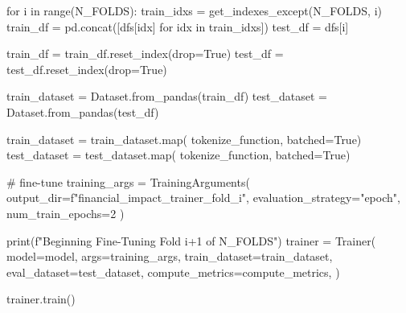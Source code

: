 \begin{python}
for i in range(N_FOLDS):
    train_idxs = get_indexes_except(N_FOLDS, i)
    train_df = pd.concat([dfs[idx] for idx in train_idxs])
    test_df = dfs[i]

    train_df = train_df.reset_index(drop=True)
    test_df = test_df.reset_index(drop=True)

    train_dataset = Dataset.from_pandas(train_df)
    test_dataset = Dataset.from_pandas(test_df)

    train_dataset = train_dataset.map(
        tokenize_function, batched=True)
    test_dataset = test_dataset.map(
        tokenize_function, batched=True)

    # fine-tune
    training_args = TrainingArguments(
        output_dir=f"financial_impact_trainer_fold_{i}",
        evaluation_strategy="epoch",
        num_train_epochs=2
    )

    print(f"Beginning Fine-Tuning Fold {i+1} of {N_FOLDS}")
    trainer = Trainer(
        model=model,
        args=training_args,
        train_dataset=train_dataset,
        eval_dataset=test_dataset,
        compute_metrics=compute_metrics,
    )

    trainer.train()

\end{python}

